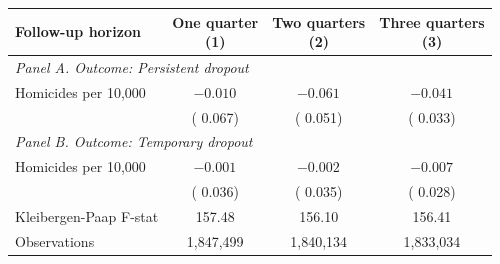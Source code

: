 \begin{tabular}{l c c c}
\hline\hline
Follow-up horizon & \shortstack{One quarter \\ (1)} & \shortstack{Two quarters \\ (2)} & \shortstack{Three quarters \\ (3)} \\
\hline
\multicolumn{4}{l}{{\small \textit{Panel A. Outcome: Persistent dropout}}} \\
Homicides per 10,000
 & $-0.010^{}$ & $-0.061^{}$ & $-0.041^{}$ \\
 & ( 0.067) & ( 0.051) & ( 0.033) \\
\hline
\multicolumn{4}{l}{{\small \textit{Panel B. Outcome: Temporary dropout}}} \\
Homicides per 10,000
 & $-0.001^{}$ & $-0.002^{}$ & $-0.007^{}$ \\
 & ( 0.036) & ( 0.035) & ( 0.028) \\
\hline
Kleibergen-Paap F-stat
 & 157.48 & 156.10 & 156.41 \\
\hline
Observations
 & 1,847,499 & 1,840,134 & 1,833,034 \\
\hline\hline
\end{tabular}
